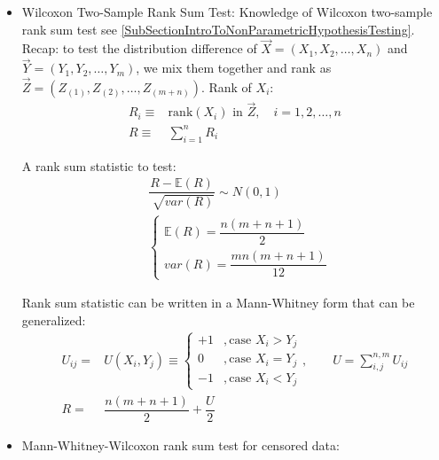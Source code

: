 \begin{itemize}[topsep=2pt,itemsep=0pt]
    \item Wilcoxon Two-Sample Rank Sum Test: Knowledge of Wilcoxon two-sample rank sum test see \autoref{SubSectionIntroToNonParametricHypothesisTesting}. Recap: to test the distribution difference of $ \vec{X}=(X_{1},X_{2},\ldots,X_{n})  $ and $ \vec{Y}=(Y_{1},Y_{2},\ldots,Y_{m})  $, we mix them together  and rank as $ \vec{Z}=(Z_{(1)},Z_{(2)},\ldots,Z_{(m+n)})$. Rank of $ X_i $:
    \begin{align}
        R_{i}\equiv &\mathrm{rank}(X_i)\text{ in } \vec{Z},\quad i=1,2,\ldots,n  \\
        R\equiv &\sum_{i=1}^nR_i
    \end{align}
        
    A rank sum statistic to test:
    \begin{align}
        &\dfrac{R-\mathbb{E}\left( R \right)}{\sqrt[]{var(R)}}\sim N(0,1)\\
        &\begin{cases}
            \mathbb{E}\left( R \right) =\dfrac{n(m+n+1)}{2}\\
            var(R)=\dfrac{mn(m+n+1)}{12}
        \end{cases}
    \end{align}

    Rank sum statistic can be written in a Mann-Whitney form that can be generalized:
    \begin{align}
        U_{ij}=&U(X_i,Y_j)\equiv\begin{cases}
            +1&,\text{case } X_i>Y_j\\
            0&,\text{case } X_i=Y_j\\
            -1&,\text{case }X_i<Y_j
        \end{cases},\qquad U=\sum_{i,j}^{n,m}U_{ij}\\
        R=&\dfrac{n(m+n+1)}{2}+\dfrac{U}{2}
    \end{align}

\item Mann-Whitney-Wilcoxon rank sum test for censored data: 


\end{itemize}
